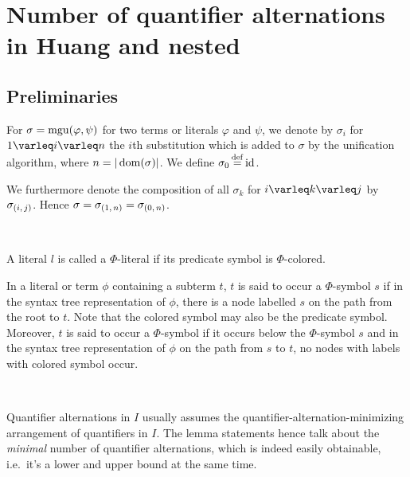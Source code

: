\documentclass[,%
	draft=false,%
	numbers=noendperiod
	12pt,
	a4paper,
	oneside,%
	openany,
]{memoir}
\begin{document}
\chapter{ Number of quantifier alternations in Huang and nested }

\section{ Preliminaries }

For $\sigma = \operatorname{mgu}(\varphi, \psi)$ for two terms or literals $\varphi$ and $\psi$, we denote by $\sigma_i$ for $1\varleq i \varleq n$ the $i$th substitution which is added to $\sigma$ by the unification algorithm, where $n = |\operatorname{dom}(\sigma)|$.
We define $\sigma_0 \defeq \id$.

We furthermore denote the composition of all $\sigma_k$ for $i\varleq k \varleq j$ by $\sigma_{(i,\,j)}$.
Hence $\sigma = \sigma_{(1,\,n)} = \sigma_{(0,\,n)}$.

~

A literal $l$ is called a $\Phi$-literal if its predicate symbol is $\Phi$-colored.



In a literal or term $\phi$ containing a subterm $t$, $t$ is said to occur  a $\Phi$-symbol $s$ if in the syntax tree representation of $\phi$, there is a node labelled $s$ on the path from the root to $t$. Note that the colored symbol may also be the predicate symbol.
Moreover, $t$ is said to occur  a $\Phi$-symbol if it occurs below the $\Phi$-symbol $s$ and in the syntax tree representation of $\phi$ on the path from $s$ to $t$, no nodes with labels with colored symbol occur.

~

Quantifier alternations in $I$ usually assumes the quantifier-alternation-minimizing arrangement of quantifiers in $I$. The lemma statements hence talk about the \emph{minimal} number of quantifier alternations, which is indeed easily obtainable, i.e.\ it's a lower and upper bound at the same time.

~
\end{document}

